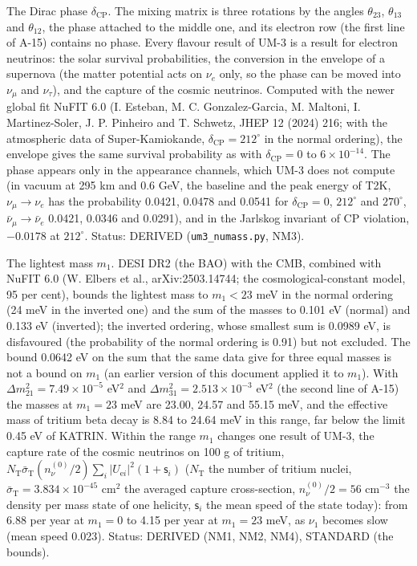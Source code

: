 \documentclass[
  10pt,
]{article}
\begin{document}
The Dirac phase \(\delta_{\mathrm{CP}}\). The mixing matrix is three
rotations by the angles \(\theta_{23}\), \(\theta_{13}\) and
\(\theta_{12}\), the phase attached to the middle one, and its electron
row (the first line of A-15) contains no phase. Every flavour result of
UM-3 is a result for electron neutrinos: the solar survival
probabilities, the conversion in the envelope of a supernova (the matter
potential acts on \(\nu_e\) only, so the phase can be moved into
\(\nu_\mu\) and \(\nu_\tau\)), and the capture of the cosmic neutrinos.
Computed with the newer global fit NuFIT 6.0 (I. Esteban, M. C.
Gonzalez-Garcia, M. Maltoni, I. Martinez-Soler, J. P. Pinheiro and T.
Schwetz, JHEP 12 (2024) 216; with the atmospheric data of
Super-Kamiokande, \(\delta_{\mathrm{CP}} = 212^\circ\) in the normal
ordering), the envelope gives the same survival probability as with
\(\delta_{\mathrm{CP}} = 0\) to \(6\times10^{-14}\). The phase appears
only in the appearance channels, which UM-3 does not compute (in vacuum
at 295 km and 0.6 GeV, the baseline and the peak energy of T2K,
\(\nu_\mu \to \nu_e\) has the probability 0.0421, 0.0478 and 0.0541 for
\(\delta_{\mathrm{CP}} = 0\), \(212^\circ\) and \(270^\circ\),
\(\bar\nu_\mu \to \bar\nu_e\) 0.0421, 0.0346 and 0.0291), and in the
Jarlskog invariant of CP violation, \(-0.0178\) at \(212^\circ\).
Status: DERIVED (\texttt{um3\_numass.py}, NM3).

The lightest mass \(m_1\). DESI DR2 (the BAO) with the CMB, combined
with NuFIT 6.0 (W. Elbers et al., arXiv:2503.14744; the
cosmological-constant model, 95 per cent), bounds the lightest mass to
\(m_1 < 23\) meV in the normal ordering (24 meV in the inverted one) and
the sum of the masses to 0.101 eV (normal) and 0.133 eV (inverted); the
inverted ordering, whose smallest sum is 0.0989 eV, is disfavoured (the
probability of the normal ordering is 0.91) but not excluded. The bound
0.0642 eV on the sum that the same data give for three equal masses is
not a bound on \(m_1\) (an earlier version of this document applied it
to \(m_1\)). With \(\Delta m^2_{21} = 7.49\times10^{-5}\) eV\(^2\) and
\(\Delta m^2_{31} = 2.513\times10^{-3}\) eV\(^2\) (the second line of
A-15) the masses at \(m_1 = 23\) meV are 23.00, 24.57 and 55.15 meV, and
the effective mass of tritium beta decay is 8.84 to 24.64 meV in this
range, far below the limit 0.45 eV of KATRIN. Within the range \(m_1\)
changes one result of UM-3, the capture rate of the cosmic neutrinos on
100 g of tritium,
\(N_{\mathrm{T}}\bar\sigma_{\mathrm{T}}(n_\nu^{(0)}/2)\sum_i\lvert U_{\mathrm{e}i}\rvert^2(1 + \mathsf{s}_i)\)
(\(N_{\mathrm{T}}\) the number of tritium nuclei,
\(\bar\sigma_{\mathrm{T}} = 3.834\times10^{-45}\) cm\(^2\) the averaged
capture cross-section, \(n_\nu^{(0)}/2 = 56\) cm\(^{-3}\) the density
per mass state of one helicity, \(\mathsf{s}_i\) the mean speed of the
state today): from 6.88 per year at \(m_1 = 0\) to 4.15 per year at
\(m_1 = 23\) meV, as \(\nu_1\) becomes slow (mean speed 0.023). Status:
DERIVED (NM1, NM2, NM4), STANDARD (the bounds).
\end{document}

